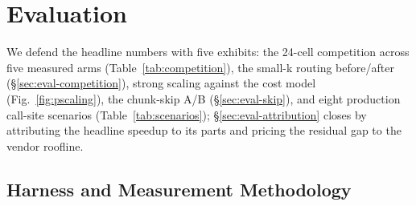 \section{Evaluation}
\label{sec:evaluation}

We defend the headline numbers with five exhibits: the 24-cell
competition across five measured arms (Table~\ref{tab:competition}), the
small-k routing before/after (\S\ref{sec:eval-competition}), strong
scaling against the cost model (Fig.~\ref{fig:pscaling}), the chunk-skip
A/B (\S\ref{sec:eval-skip}), and eight production call-site scenarios
(Table~\ref{tab:scenarios}); \S\ref{sec:eval-attribution} closes by
attributing the headline speedup to its parts and pricing the residual
gap to the vendor roofline.

\subsection{Harness and Measurement Methodology}
\label{sec:eval-method}

